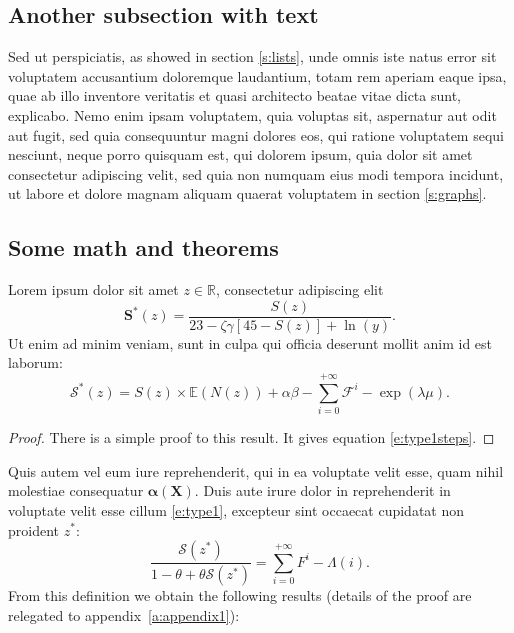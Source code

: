 \documentclass[letterpaper,12pt,leqno]{article}
\begin{document}
\subsection{Another subsection with text}

Sed ut perspiciatis, as showed in section \ref{s:lists}, unde omnis iste natus error sit voluptatem accusantium doloremque laudantium, totam rem aperiam eaque ipsa, quae ab illo inventore veritatis et quasi architecto beatae vitae dicta sunt, explicabo. Nemo enim ipsam voluptatem, quia voluptas sit, aspernatur aut odit aut fugit, sed quia consequuntur magni dolores eos, qui ratione voluptatem sequi nesciunt, neque porro quisquam est, qui dolorem ipsum, quia dolor sit amet consectetur adipiscing velit, sed quia non numquam eius modi tempora incidunt, ut labore et dolore magnam aliquam quaerat voluptatem in section \ref{s:graphs}.

\subsection{Some math and theorems} 

\begin{proposition}\label{p:type1}  Lorem ipsum dolor sit amet $z \in \mathbb{R}$, consectetur adipiscing elit
\begin{equation}
\bm{S}^*(z) = \frac{S(z)}{23 -\zeta\gamma [45- S(z)] + \ln(y)}.
\label{e:type1}\end{equation}
Ut enim ad minim veniam, sunt in culpa qui officia deserunt mollit anim id est laborum:
\begin{equation}
\mathcal{S}^*(z) = S(z) \times \mathbb{E}(N(z)) + \alpha \beta - \sum_{i=0}^{+\infty}\mathcal{F}^{i}-\exp(\lambda \mu).
\label{e:type1steps}\end{equation}
\end{proposition}

\begin{proof} There is a simple proof to this result. It gives equation \eqref{e:type1steps}.\end{proof} 

Quis autem vel eum iure reprehenderit, qui in ea voluptate velit esse, quam nihil molestiae consequatur $\bm{\alpha(X)}$. Duis aute irure dolor in reprehenderit in voluptate velit esse cillum \eqref{e:type1}, excepteur sint occaecat cupidatat non proident $z^*$:
\begin{equation*}
\frac{\mathcal{S}(z^*)}{1 -\theta + \theta \mathcal{S}(z^*)} = \sum_{i=0}^{+\infty}F^{i} - \Lambda(i).
\end{equation*}
From this definition we obtain the following results (details of the proof are relegated to appendix~\ref{a:appendix1}):
\end{document}
